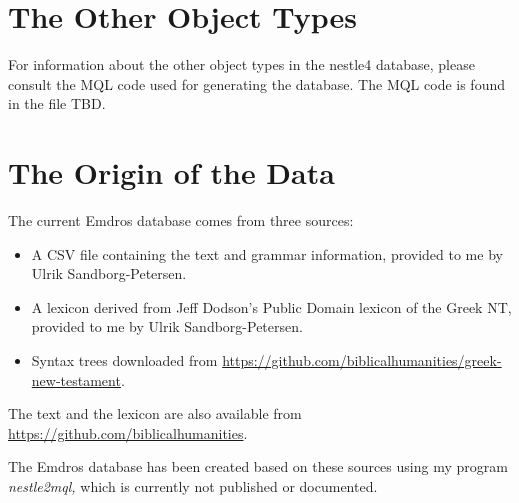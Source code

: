 \documentclass[11pt,oneside,a4paper]{memoir}
\begin{document}
\section{The Other Object Types}

For information about the other object types in the nestle4 database, please consult the MQL code
used for generating the database. The MQL code is found in the file TBD.


\section{The Origin of the Data}

The current Emdros database comes from three sources:

\begin{itemize}
\item A CSV file containing the text and grammar information, provided to me by Ulrik
  Sandborg-Petersen.
\item A lexicon derived from Jeff Dodson's Public Domain lexicon of the Greek NT, provided to me by
  Ulrik Sandborg-Petersen.
\item Syntax trees downloaded from
  \url{https://github.com/biblicalhumanities/greek-new-testament}.
\end{itemize}

The text and the lexicon are also available from \url{https://github.com/biblicalhumanities}.

The Emdros database has been created based on these sources using my program \emph{nestle2mql,}
which is currently not published or documented.

\printindex
\end{document}
